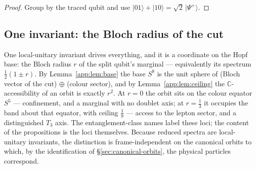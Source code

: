 \begin{proof}
Group by the traced qubit and use $\lvert01\rangle+\lvert10\rangle = \sqrt2\,\lvert\Psi^+\rangle$.
\end{proof}

\subsection{One invariant: the Bloch radius of the cut}

One local-unitary invariant drives everything, and it is a coordinate on the Hopf base: the Bloch
radius $r$ of the split qubit's marginal --- equivalently its spectrum $\tfrac12(1\pm r)$. By
Lemma~\ref{app:lem:base} the base $S^8$ is the unit sphere of (Bloch vector of the cut) $\oplus$
(colour sector), and by Lemma~\ref{app:lem:ceiling} the $\mathbb{C}$-accessibility of an orbit is
exactly $r^2$. At $r = 0$ the orbit sits on the colour equator $S^5$ --- confinement, and a marginal
with no doublet axis; at $r = \tfrac13$ it occupies the band about that equator, with ceiling
$\tfrac19$ --- access to the lepton sector, and a distinguished $T_3$ axis. The entanglement-class
names label these loci; the content of the propositions is the loci themselves. Because reduced
spectra are local-unitary invariants, the distinction is frame-independent on the canonical orbits
to which, by the identification of \S\ref{sec:canonical-orbits}, the physical particles correspond.
